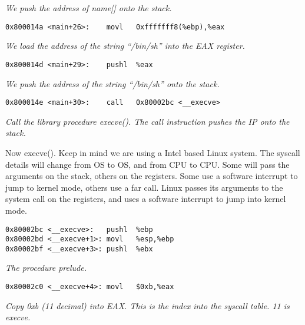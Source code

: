 \documentclass[a4paper]{article}
\begin{document}
\textit{We push the address of name[] onto the stack.
}

\begin{verbatim}
0x800014a <main+26>:    movl   0xfffffff8(%ebp),%eax
\end{verbatim}

\textit{We load the address of the string “/bin/sh” into the EAX register.
}

\begin{verbatim}
0x800014d <main+29>:    pushl  %eax
\end{verbatim}

\textit{We push the address of the string “/bin/sh” onto the stack.}

\begin{verbatim}
0x800014e <main+30>:    call   0x80002bc <__execve>
\end{verbatim}


\textit{Call the library procedure execve(). The call instruction pushes the IP onto the stack.
}

Now execve(). Keep in mind we are using a Intel based Linux system. The syscall details will change from OS to OS, and from CPU to CPU. Some will pass the arguments on the stack, others on the registers. Some use a software interrupt to jump to kernel mode, others use a far call. Linux passes its arguments to the system call on the registers, and uses a software interrupt to jump into kernel mode.

\begin{verbatim}
0x80002bc <__execve>:   pushl  %ebp
0x80002bd <__execve+1>: movl   %esp,%ebp
0x80002bf <__execve+3>: pushl  %ebx
\end{verbatim}

\textit{The procedure prelude.
}

\begin{verbatim}
0x80002c0 <__execve+4>: movl   $0xb,%eax
\end{verbatim}

\textit{Copy 0xb (11 decimal) into EAX. This is the index into the syscall table. 11 is execve.
}
\end{document}
